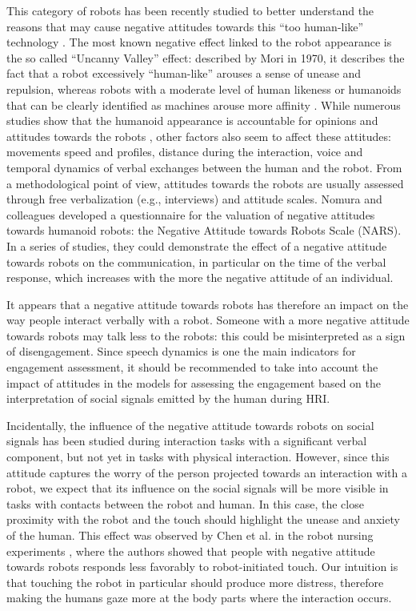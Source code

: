 \documentclass[twocolumn]{svjour3}          %
\begin{document}
This category of robots has been recently studied to better understand the reasons that may cause negative attitudes towards this ``too human-like'' technology \cite{Saygin2012}. 
The most known negative effect linked to the robot appearance is the so called ``Uncanny Valley'' effect: described by Mori in 1970, it describes the fact that a robot excessively ``human-like'' arouses a sense of unease and repulsion, whereas robots with a moderate level of human likeness or humanoids that can be clearly identified as machines arouse more affinity \cite{UncannyRAM2012}.
While numerous studies show that the humanoid appearance is accountable for opinions and attitudes towards the robots \cite{Gray2012}, other factors also seem to affect these attitudes: movements speed and profiles, distance during the interaction, voice and temporal dynamics of verbal exchanges between the human and the robot. 
From a methodological point of view, attitudes towards the robots are usually assessed through  free verbalization (e.g., interviews) and attitude scales.
Nomura and colleagues \cite{Nomura2006nars,NARS2006} developed a questionnaire for the valuation of negative attitudes towards humanoid robots: the Negative Attitude towards Robots Scale (NARS). In a series of studies, they could demonstrate the effect of a negative attitude towards robots on the communication, in particular on the time of the verbal response, which increases with the more the negative attitude of an individual.

It appears that a negative attitude towards robots has therefore an impact on the way people interact verbally with a robot. Someone with a more negative attitude towards robots may talk less to the robots: this could be misinterpreted as a sign of disengagement.
Since speech dynamics is one the main indicators for engagement assessment, it should be recommended to take into account the impact of attitudes in the models for assessing the engagement based on the interpretation of social signals emitted by the human during HRI.

Incidentally, the influence of the negative attitude towards robots on social signals has been studied during interaction tasks with a significant verbal component, but not yet in tasks with physical interaction. 
However, since this attitude captures the worry of the person projected towards an interaction with a robot, we expect that its influence on the social signals will be more visible in tasks with contacts between the robot and human. 
In this case, the close proximity with the robot and the touch should highlight the unease and anxiety of the human.
This effect was observed by Chen et al. in the robot nursing experiments \cite{Chen2014NARStouch}, where the authors showed that people with negative attitude towards robots responds less favorably to robot-initiated touch. 
Our intuition is that touching the robot in particular should produce more distress, therefore making the humans gaze more at the body parts where the interaction occurs.
\end{document}
